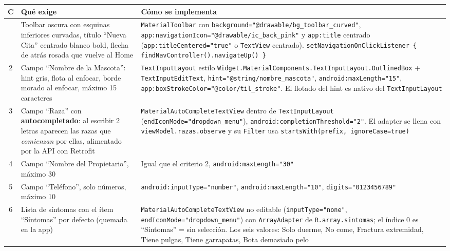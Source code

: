\documentclass[11pt,letterpaper]{article}
\newcommand{\code}[1]{\texttt{\small #1}}
\begin{document}
\begin{center}
\footnotesize
\begin{xltabular}{\linewidth}{@{}c X X@{}}
\toprule
\textbf{C} & \textbf{Qu\'e exige} & \textbf{C\'omo se implementa}\\
\midrule
\endhead
\bottomrule
{} & Toolbar oscura con esquinas inferiores curvadas, t\'itulo ``Nueva Cita'' centrado blanco bold, flecha de atr\'as rosada que vuelve al Home & \code{MaterialToolbar} con \code{background=\allowbreak{}"@drawable/\allowbreak{}bg\_toolbar\_curved"}, \code{app:navigationIcon=\allowbreak{}"@drawable/\allowbreak{}ic\_back\_pink"} y \code{app:title} centrado (\code{app:titleCentered=\allowbreak{}"true"} o \code{TextView} centrado). \code{setNavigationOnClickListener \{ findNavController(\allowbreak{}).navigateUp(\allowbreak{}) \}}\\
2 & Campo ``Nombre de la Mascota'': hint gris, flota al enfocar, borde morado al enfocar, m\'aximo 15 caracteres & \code{TextInputLayout} estilo \code{Widget.\allowbreak{}MaterialComponents.\allowbreak{}TextInputLayout.\allowbreak{}OutlinedBox} + \code{TextInputEditText}, \code{hint="@string/\allowbreak{}nombre\_mascota"}, \code{android:\allowbreak{}maxLength=\allowbreak{}"15"}, \code{app:boxStrokeColor=\allowbreak{}"@color/\allowbreak{}til\_stroke"}. El flotado del hint es nativo del \code{TextInputLayout}\\
3 & Campo ``Raza'' con \textbf{autocompletado}: al escribir 2 letras aparecen las razas que \emph{comienzan} por ellas, alimentado por la API con Retrofit & \code{MaterialAutoCompleteTextView} dentro de \code{TextInputLayout} (\code{endIconMode=\allowbreak{}"dropdown\_menu"}), \code{android:\allowbreak{}completionThreshold=\allowbreak{}"2"}. El adapter se llena con \code{viewModel.\allowbreak{}razas.observe} y su \code{Filter} usa \code{startsWith(\allowbreak{}prefix,\allowbreak{} ignoreCase=\allowbreak{}true)}\\
4 & Campo ``Nombre del Propietario'', m\'aximo 30 & Igual que el criterio 2, \code{android:\allowbreak{}maxLength=\allowbreak{}"30"}\\
5 & Campo ``Tel\'efono'', solo n\'umeros, m\'aximo 10 & \code{android:\allowbreak{}inputType=\allowbreak{}"number"}, \code{android:\allowbreak{}maxLength=\allowbreak{}"10"}, \code{digits=\allowbreak{}"0123456789"}\\
6 & Lista de s\'intomas con el \'item ``S\'intomas'' por defecto (quemada en la app) & \code{MaterialAutoCompleteTextView} no editable (\code{inputType=\allowbreak{}"none"}, \code{endIconMode=\allowbreak{}"dropdown\_menu"}) con \code{ArrayAdapter} de \code{R.array.sintomas}; el \'indice 0 es ``S\'intomas'' = sin selecci\'on. Los seis valores: Solo duerme, No come, Fractura extremidad, Tiene pulgas, Tiene garrapatas, Bota demasiado pelo\\

\end{xltabular}
\end{center}
\end{document}
